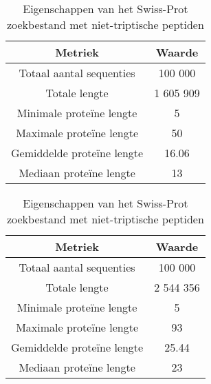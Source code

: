\documentclass[11pt,dutch,faculty=we,layout=titlefont,underline=false,titleUppercase=true,titleUnderline=true]{ugent2016-report}
\begin{document}
    \begin{table}[!h]
        \begin{minipage}{.5\linewidth}
            \centering
            \begin{tabular}{c c}
                Metriek                    & Waarde    \\
                \hline\hline
                Totaal aantal sequenties   & 100 000   \\
                Totale lengte              & 1 605 909 \\
                Minimale proteïne lengte   & 5         \\
                Maximale proteïne lengte   & 50        \\
                Gemiddelde proteïne lengte & 16.06     \\
                Mediaan proteïne lengte    & 13        \\
                \hline
            \end{tabular}
            \caption{Eigenschappen van \newline het Swiss-Prot zoekbestand \newline met triptische peptiden}
            \label{tab:swiss_niet_triptisch}
        \end{minipage}
        \begin{minipage}{.5\linewidth}
            \centering
            \begin{tabular}{ c c }
                Metriek                    & Waarde    \\
                \hline\hline
                Totaal aantal sequenties   & 100 000   \\
                Totale lengte              & 2 544 356 \\
                Minimale proteïne lengte   & 5         \\
                Maximale proteïne lengte   & 93        \\
                Gemiddelde proteïne lengte & 25.44     \\
                Mediaan proteïne lengte    & 23        \\
                \hline
            \end{tabular}
            \caption{Eigenschappen van \newline het Swiss-Prot zoekbestand \newline met niet-triptische peptiden}
            \label{tab:swiss_triptisch}
        \end{minipage}
    \end{table}
\end{document}
